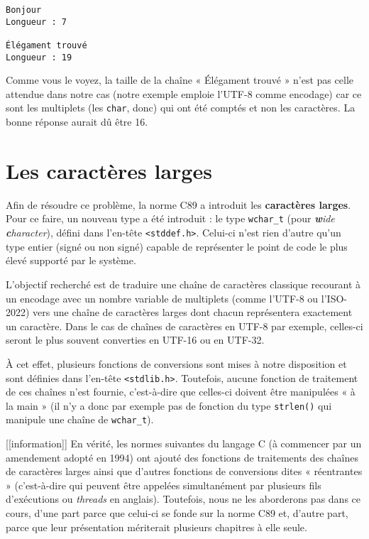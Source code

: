 \documentclass[]{article}
\begin{document}
\begin{verbatim}
Bonjour   
Longueur : 7

Élégament trouvé
Longueur : 19
\end{verbatim}

Comme vous le voyez, la taille de la chaîne « Élégament trouvé » n'est
pas celle attendue dans notre cas (notre exemple emploie l'UTF-8 comme
encodage) car ce sont les multiplets (les \texttt{char}, donc) qui ont
été comptés et non les caractères. La bonne réponse aurait dû être 16.

\section{Les caractères larges}\label{les-caractuxe8res-larges}

Afin de résoudre ce problème, la norme C89 a introduit les
\textbf{caractères larges}. Pour ce faire, un nouveau type a été
introduit : le type \texttt{wchar\_t} (pour \emph{\textbf{w}ide
\textbf{c}haracter}), défini dans l'en-tête
\texttt{\textless{}stddef.h\textgreater{}}. Celui-ci n'est rien d'autre
qu'un type entier (signé ou non signé) capable de représenter le point
de code le plus élevé supporté par le système.

L'objectif recherché est de traduire une chaîne de caractères classique
recourant à un encodage avec un nombre variable de multiplets (comme
l'UTF-8 ou l'ISO-2022) vers une chaîne de caractères larges dont chacun
représentera exactement un caractère. Dans le cas de chaînes de
caractères en UTF-8 par exemple, celles-ci seront le plus souvent
converties en UTF-16 ou en UTF-32.

À cet effet, plusieurs fonctions de conversions sont mises à notre
disposition et sont définies dans l'en-tête
\texttt{\textless{}stdlib.h\textgreater{}}. Toutefois, aucune fonction
de traitement de ces chaînes n'est fournie, c'est-à-dire que celles-ci
doivent être manipulées « à la main » (il n'y a donc par exemple pas de
fonction du type \texttt{strlen()} qui manipule une chaîne de
\texttt{wchar\_t}).

{[}{[}information{]}{]} \textbar{} En vérité, les normes suivantes du
langage C (à commencer par un amendement adopté en 1994) ont ajouté des
fonctions de traitements des chaînes de caractères larges ainsi que
d'autres fonctions de conversions dites « réentrantes » (c'est-à-dire
qui peuvent être appelées simultanément par plusieurs fils d'exécutions
ou \emph{threads} en anglais). Toutefois, nous ne les aborderons pas
dans ce cours, d'une part parce que celui-ci se fonde sur la norme C89
et, d'autre part, parce que leur présentation mériterait plusieurs
chapitres à elle seule.
\end{document}

